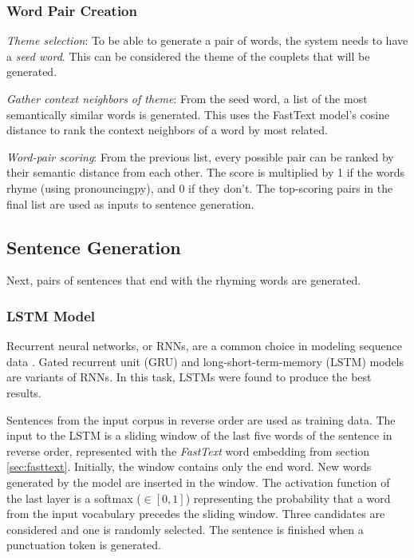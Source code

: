 \documentclass[11pt,a4paper]{article}
\newenvironment{tight_enumerate}{
\begin{enumerate}
\setlength{\itemsep}{0pt}
\setlength{\parskip}{0pt}
}{\end{enumerate}}
\begin{document}
\subsubsection{Word Pair Creation}
\begin{tight_enumerate}
	\item \textit{Theme selection}: To be able to generate a pair of words, the system needs to have a \textit{seed word}. This can be considered the theme of the couplets that will be generated.
	\item \textit{Gather context neighbors of theme}: From the seed word, a list of the most semantically similar words is generated. This uses the FastText model's cosine distance to rank the context neighbors of a word by most related.
	\item \textit{Word-pair scoring}: From the previous list, every possible pair can be ranked by their semantic distance from each other. The score is multiplied by 1 if the words rhyme (using pronouncingpy), and 0 if they don't. The top-scoring pairs in the final list are used as inputs to sentence generation.
\end{tight_enumerate}

\subsection{Sentence Generation}
\label{sec:languagegen}

Next, pairs of sentences that end with the rhyming words are generated.

\subsubsection{LSTM Model}
\label{sec:lstm}
Recurrent neural networks, or RNNs, are a common choice in modeling sequence data \cite{rnn}. Gated recurrent unit (GRU) \cite{gru} and long-short-term-memory (LSTM) models \cite{lstm} are variants of RNNs. In this task, LSTMs were found to produce the best results.

Sentences from the input corpus in reverse order are used as training data. The input to the LSTM is a sliding window of the last five words of the sentence in reverse order, represented with the \textit{FastText} word embedding from section \ref{sec:fasttext}. Initially, the window contains only the end word. New words generated by the model are inserted in the window. The activation function of the last layer is a softmax ($\in [0, 1]$) representing the probability that a word from the input vocabulary precedes the sliding window. Three candidates are considered and one is randomly selected. The sentence is finished when a punctuation token is generated.
\end{document}
